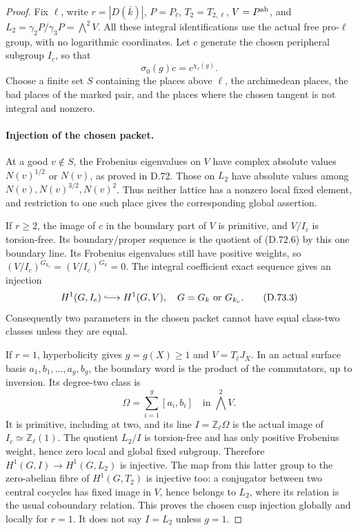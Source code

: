 \begin{proof}
Fix \(\ell\), write \(r=|D(\bar k)|\), \(P=P_\ell\),
\(T_2=T_{2,\ell}\), \(V=P^{\rm ab}\), and
\(L_2=\gamma_2P/\gamma_3P=\bigwedge^2V\).
All these integral identifications use the actual
free pro-\(\ell\) group, with no logarithmic
coordinates. Let \(c\) generate the chosen
peripheral subgroup \(I_c\), so that
\[
                   \sigma_0(g)c=c^{\chi_\ell(g)}.       \tag{D.73.2}
\]
Choose a finite set \(S\) containing the places above
\(\ell\), the archimedean places, the bad places of
the marked pair, and the places where the chosen
tangent is not integral and nonzero.

\paragraph{Injection of the chosen packet.}
At a good \(v\notin S\), the Frobenius eigenvalues
on \(V\) have complex absolute values \(N(v)^{1/2}\)
or \(N(v)\), as proved in D.72. Those on \(L_2\)
have absolute values among \(N(v),N(v)^{3/2},N(v)^2\).
Thus neither lattice has a nonzero local fixed
element, and restriction to one such place gives
the corresponding global assertion.

If \(r\ge2\), the image of \(c\) in the boundary
part of \(V\) is primitive, and \(V/I_c\) is
torsion-free. Its boundary/proper sequence is
the quotient of (D.72.6) by this one boundary
line. Its Frobenius eigenvalues still have
positive weights, so
\((V/I_c)^{G_{k_v}}=(V/I_c)^{G_k}=0\).
The integral coefficient exact sequence gives
an injection
\[
 H^1(G,I_c)\lhook\joinrel\longrightarrow H^1(G,V),
                 \quad G=G_k\text{ or }G_{k_v}.        \tag{D.73.3}
\]
Consequently two parameters in the chosen
packet cannot have equal class-two classes
unless they are equal.

If \(r=1\), hyperbolicity gives \(g=g(X)\ge1\)
and \(V=T_\ell J_X\). In an actual surface
basis \(a_1,b_1,\ldots,a_g,b_g\), the boundary
word is the product of the commutators, up
to inversion. Its degree-two class is
\[
                  \Omega=\sum_{i=1}^g[a_i,b_i]
                        \quad\text{in }\bigwedge^2V.  \tag{D.73.4}
\]
It is primitive, including at two, and its
line \(I=\mathbb Z_\ell\Omega\) is the actual
image of \(I_c\simeq\mathbb Z_\ell(1)\).
The quotient \(L_2/I\) is torsion-free and
has only positive Frobenius weight, hence
zero local and global fixed subgroup.
Therefore \(H^1(G,I)\to H^1(G,L_2)\) is
injective. The map from this latter group
to the zero-abelian fibre of \(H^1(G,T_2)\)
is injective too: a conjugator between
two central cocycles has fixed image in
\(V\), hence belongs to \(L_2\), where
its relation is the usual coboundary
relation. This proves the chosen cusp
injection globally and locally for \(r=1\).
It does not say \(I=L_2\) unless \(g=1\).


\end{proof}
